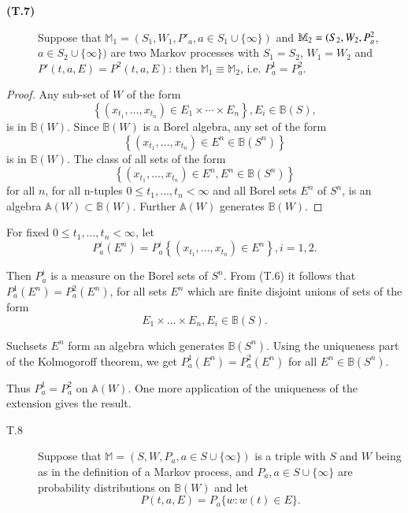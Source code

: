 \begin{description}
\item[{\bf (T.7)}] Suppose that $\mathbb{M}_1= (S_1, W_1, P'_a, a \in S_1 \cup
  \{ \infty \})$ and $\mathbb{M}_2= (S_2, W_2,\break P^2_a$, $a \in  S_2 \cup
  \{  \infty \})$ are two Markov processes with $S_1 =
  S_2$,\pageoriginale 
$W_1= W_2$
  and $P' (t,a,E)=P^2 (t,a,E)$: then $\mathbb{M}_1 \equiv
  \mathbb{M}_2$, i.e. $P^1_a = P^2_a$. 
\end{description}

\begin{proof}
Any sub-set of $W$ of the form
  $$
  \left\{ (x_{t_1}, \ldots , x_{t_n}) \in E_1 \times \cdots \times E_n \right\},
  E_i \in \mathbb{B}(S), 
  $$
  is in  $\mathbb{B} (W)$. Since $\mathbb{B} (W)$ is a Borel algebra,
  any set of the form  
  $$
  \left\{ (x_{t_1} , \ldots , x_{t_n}) \in E^n  \in  \mathbb{B}(S^n) \right\}
  $$
  is in $\mathbb{B}(W)$. The class of all sets of the form
  $$
  \left\{ (x_{t_1}, \ldots, x_{t_n}) \in E^n, E^n \in  \mathbb{B}(S^n) \right\}
  $$
  for all $n$, for all n-tuples $0 \le t_1,  \ldots , t_n <  \infty$
  and all Borel sets $E^n$ of $S^n$, is an algebra $\mathbb{A} (W)
  \subset \mathbb{B} (W)$. Further $\mathbb{A} (W)$ generates
  $\mathbb{B} (W)$. 
\end{proof}

For fixed $0 \le t_1 , \ldots , t_n < \infty $, let 
$$
P^i_a (E^n) = P^i_a \left\{( x_{t_1} , \ldots , x_{t_n}) \in E^n \right\}, i=1,2.
$$

Then $P^i_a$ is a measure on the Borel sets of $S^n$. From (T.6) it
follows that $P^1_a (E^n) = P^2_a (E^n)$, for all sets $E^n$ which are
finite disjoint unions of sets of the form 
$$
E_1 \times \ldots \times E_n, E_i \in \mathbb{B}(S).
$$

Such\pageoriginale sets $E^n$ form an algebra which generates $\mathbb{B}
(S^n)$. Using the uniqueness part of the Kolmogoroff theorem, we get
$P^1_a (E^n) = P^2_a (E^n)$ for all $E^n \in \mathbb{B} (S^n)$. 

Thus $P^1_a = P^2_a$ on $\mathbb{A} (W)$. One more application of the
uniqueness of the extension gives the result. 

\begin{description}
\item[T.8] Suppose that $\mathbb{M}=(S,W,P_a ,a \in S \cup \{
  \infty\}) $ is a triple with $S$ and $W$ being as in the definition
  of a Markov process, and  $P_a, a   \in S \cup \{ \infty\}$ are
  probability distributions on $\mathbb{B}(W)$ and let  
  $$
  P(t,a,E) = P_a \{w: w(t) \in E \}.
  $$ 
\end{description}


